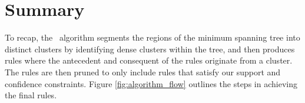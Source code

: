 \section{Summary}
To recap, the \algo\ algorithm segments the regions of the minimum spanning tree into distinct clusters by identifying dense clusters within the tree, and then produces rules where the antecedent and consequent of the rules originate from a cluster. The rules are then pruned to only include rules that satisfy our support and confidence constraints. Figure \ref{fig:algorithm_flow} outlines the steps in achieving the final rules.